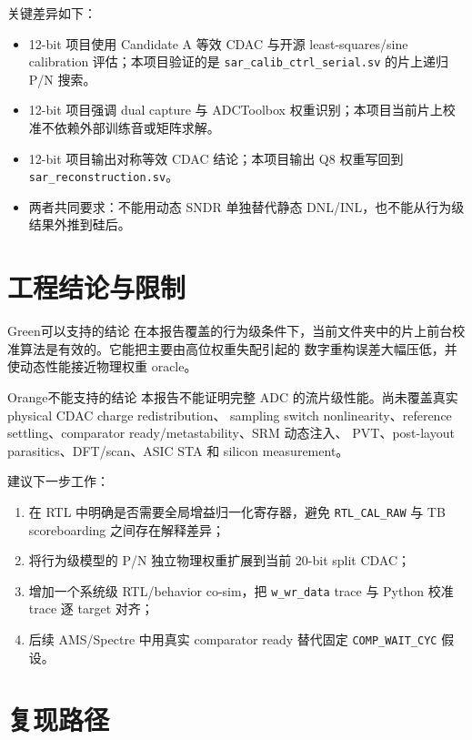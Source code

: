 \documentclass[UTF8,a4paper,11pt,fontset=windows]{ctexart}
\begin{document}
关键差异如下：
\begin{itemize}
  \item 12-bit 项目使用 Candidate A 等效 CDAC 与开源 least-squares/sine calibration 评估；本项目验证的是
        \texttt{sar\_calib\_ctrl\_serial.sv} 的片上递归 P/N 搜索。
  \item 12-bit 项目强调 dual capture 与 ADCToolbox 权重识别；本项目当前片上校准不依赖外部训练音或矩阵求解。
  \item 12-bit 项目输出对称等效 CDAC 结论；本项目输出 Q8 权重写回到 \texttt{sar\_reconstruction.sv}。
  \item 两者共同要求：不能用动态 SNDR 单独替代静态 DNL/INL，也不能从行为级结果外推到硅后。
\end{itemize}

\section{工程结论与限制}

\begin{verdictbox}{Green}{可以支持的结论}
在本报告覆盖的行为级条件下，当前文件夹中的片上前台校准算法是有效的。它能把主要由高位权重失配引起的
数字重构误差大幅压低，并使动态性能接近物理权重 oracle。
\end{verdictbox}

\begin{verdictbox}{Orange}{不能支持的结论}
本报告不能证明完整 ADC 的流片级性能。尚未覆盖真实 physical CDAC charge redistribution、
sampling switch nonlinearity、reference settling、comparator ready/metastability、SRM 动态注入、
PVT、post-layout parasitics、DFT/scan、ASIC STA 和 silicon measurement。
\end{verdictbox}

建议下一步工作：
\begin{enumerate}
  \item 在 RTL 中明确是否需要全局增益归一化寄存器，避免 \texttt{RTL\_CAL\_RAW} 与 TB scoreboarding
        之间存在解释差异；
  \item 将行为级模型的 P/N 独立物理权重扩展到当前 20-bit split CDAC；
  \item 增加一个系统级 RTL/behavior co-sim，把 \texttt{w\_wr\_data} trace 与 Python 校准 trace 逐 target 对齐；
  \item 后续 AMS/Spectre 中用真实 comparator ready 替代固定 \texttt{COMP\_WAIT\_CYC} 假设。
\end{enumerate}

\section{复现路径}
\end{document}
